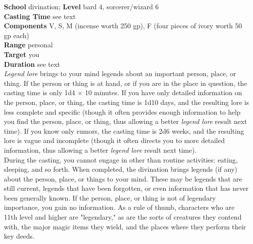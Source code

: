 \textbf{School} divination; \textbf{Level} bard 4, sorcerer/wizard 6\\
\textbf{Casting Time} see text\\
\textbf{Components} V, S, M (incense worth 250 gp), F (four pieces of ivory worth 50 gp each)\\
\textbf{Range} personal\\
\textbf{Target} you\\
\textbf{Duration} see text\\
\textit{Legend lore }brings to your mind legends about an important person, place, or thing. If the person or thing is at hand, or if you are in the place in question, the casting time is only 1d4 × 10 minutes. If you have only detailed information on the person, place, or thing, the casting time is 1d10 days, and the resulting lore is less complete and specific (though it often provides enough information to help you find the person, place, or thing, thus allowing a better \textit{legend lore }result next time). If you know only rumors, the casting time is 2d6 weeks, and the resulting lore is vague and incomplete (though it often directs you to more detailed information, thus allowing a better \textit{legend lore }result next time).\\
During the casting, you cannot engage in other than routine activities: eating, sleeping, and so forth. When completed, the divination brings legends (if any) about the person, place, or things to your mind. These may be legends that are still current, legends that have been forgotten, or even information that has never been generally known. If the person, place, or thing is not of legendary importance, you gain no information. As a rule of thumb, characters who are 11th level and higher are "legendary," as are the sorts of creatures they contend with, the major magic items they wield, and the places where they perform their key deeds.\\
